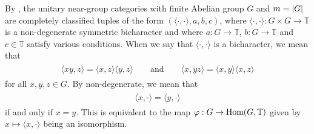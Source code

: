 \noindent By \cite[Theorem 9.1]{Izu17}, the unitary near-group categories with finite Abelian group $G$ and $m = \lvert G\rvert$ are completely classified tuples of the form $(\langle\cdot,\cdot\rangle, a, b, c)$, where $\langle\cdot,\cdot\rangle : G \times G \to \mathbb{T}$ is a non-degenerate symmetric bicharacter and where $a : G \to \mathbb{T}$, $b : G \to \mathbb{T}$ and $c \in \mathbb{T}$ satisfy various conditions. When we say that $\langle\cdot,\cdot\rangle$ is a bicharacter, we mean that
\begin{align*}
\begin{split}
\langle xy, z\rangle = \langle x, z\rangle\langle y, z\rangle\qquad\text{and}\qquad\langle x, yz\rangle = \langle x, y\rangle\langle x, z\rangle
\end{split}
\end{align*}
for all $x, y, z \in G$. By non-degenerate, we mean that
\begin{align*}
\begin{split}
\langle x, \cdot\rangle = \langle y, \cdot\rangle
\end{split}
\end{align*}
\noindent if and only if $x = y$. This is equivalent to the map $\varphi : G \to \textup{Hom}(G, \mathbb{T})$ given by $x \mapsto \langle x, \cdot\rangle$ being an isomorphism.\\
\newpage

